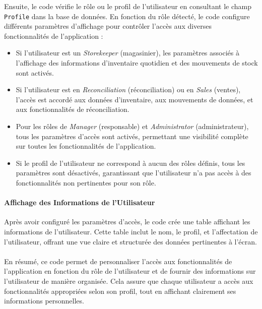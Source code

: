 \documentclass[a4paper, oneside, 12pt, final]{extreport}
\begin{document}
Ensuite, le code vérifie le rôle ou le profil de l'utilisateur en consultant le champ \texttt{Profile} dans la base de données. En fonction du rôle détecté, le code configure différents paramètres d'affichage pour contrôler l'accès aux diverses fonctionnalités de l'application :

\begin{itemize}
    \item Si l'utilisateur est un \textit{Storekeeper} (magasinier), les paramètres associés à l'affichage des informations d'inventaire quotidien et des mouvements de stock sont activés.
    \item Si l'utilisateur est en \textit{Reconciliation} (réconciliation) ou en \textit{Sales} (ventes), l'accès est accordé aux données d'inventaire, aux mouvements de données, et aux fonctionnalités de réconciliation.
    \item Pour les rôles de \textit{Manager} (responsable) et \textit{Administrator} (administrateur), tous les paramètres d'accès sont activés, permettant une visibilité complète sur toutes les fonctionnalités de l'application.
    \item Si le profil de l'utilisateur ne correspond à aucun des rôles définis, tous les paramètres sont désactivés, garantissant que l'utilisateur n'a pas accès à des fonctionnalités non pertinentes pour son rôle.
\end{itemize}

\paragraph{Affichage des Informations de l'Utilisateur}
Après avoir configuré les paramètres d'accès, le code crée une table affichant les informations de l'utilisateur. Cette table inclut le nom, le profil, et l'affectation de l'utilisateur, offrant une vue claire et structurée des données pertinentes à l'écran.
\\
\\
En résumé, ce code permet de personnaliser l'accès aux fonctionnalités de l'application en fonction du rôle de l'utilisateur et de fournir des informations sur l'utilisateur de manière organisée. Cela assure que chaque utilisateur a accès aux fonctionnalités appropriées selon son profil, tout en affichant clairement ses informations personnelles.
\newpage
\end{document}
